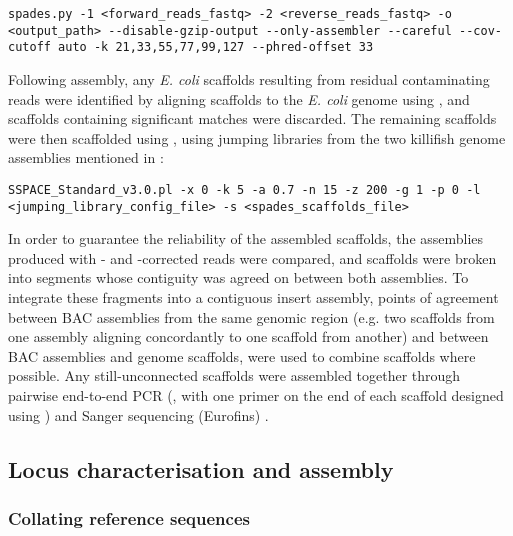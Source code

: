 \begin{lstlisting}
spades.py -1 <forward_reads_fastq> -2 <reverse_reads_fastq> -o <output_path> --disable-gzip-output --only-assembler --careful --cov-cutoff auto -k 21,33,55,77,99,127 --phred-offset 33
\end{lstlisting}

Following assembly, any \textit{E. coli} scaffolds resulting from residual contaminating reads were identified by aligning scaffolds to the \textit{E. coli} genome using  \parencite{altschul1990blast,altschul1997blast}, and scaffolds containing significant matches were discarded. The remaining scaffolds were then scaffolded using  \parencite{boetzer2011sspace}, using jumping libraries from the two killifish genome assemblies mentioned in  \parencite{valenzano2015genome,reichwald2015genome}:

\begin{lstlisting}
SSPACE_Standard_v3.0.pl -x 0 -k 5 -a 0.7 -n 15 -z 200 -g 1 -p 0 -l <jumping_library_config_file> -s <spades_scaffolds_file>
\end{lstlisting}

In order to guarantee the reliability of the assembled scaffolds, the assemblies produced with - and -corrected reads were compared, and scaffolds were broken into segments whose contiguity was agreed on between both assemblies. To integrate these fragments into a contiguous insert assembly, points of agreement between BAC assemblies from the same genomic region (e.g. two scaffolds from one assembly aligning concordantly to one scaffold from another) and between BAC assemblies and genome scaffolds, were used to combine scaffolds where possible. Any still-unconnected scaffolds were assembled together through pairwise end-to-end PCR (, with one primer on the end of each scaffold designed using  \parencite{untergasser2012primer3}) and Sanger sequencing (Eurofins) \parencite{sanger1977sequencing}.

\subsection{Locus characterisation and assembly}
\label{sec:methods_comp_locus}

\subsubsection{Collating reference sequences}
\label{sec:methods_comp_locus_reference}

